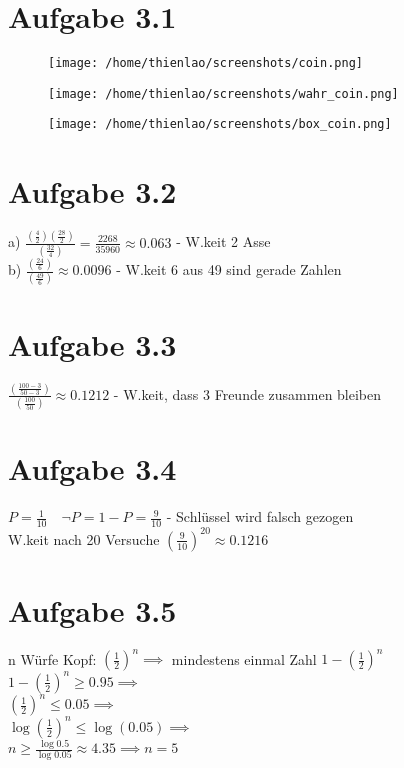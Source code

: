 \documentclass{article}
\begin{document}
		\section*{Aufgabe 3.1}
		\begin{figure} [h]
			\centering
			\texttt{[image: /home/thienlao/screenshots/coin.png]}
		\end{figure}
		\vspace{2cm}
		\begin{figure} [h]
			\centering
			\texttt{[image: /home/thienlao/screenshots/wahr\_coin.png]}
		\end{figure}
		\vspace{2cm}
		\begin{figure} [h]
			\centering
			\texttt{[image: /home/thienlao/screenshots/box\_coin.png]}
		\end{figure}
		
		\section*{Aufgabe 3.2}
		a) $\frac{(\frac{4}{2})(\frac{28}{2})}{(\frac{32}{4})} = \frac{2268}{35960} \approx 0.063$ - W.keit 2 Asse  \\
		\newline
		b) $\frac{(\frac{24}{6})}{(\frac{49}{6})} \approx 0.0096$ - W.keit 6 aus 49 sind gerade Zahlen
		
		\section*{Aufgabe 3.3}
		$\frac{(\frac{100 - 3}{50 - 3})}{(\frac{100}{50})} \approx 0.1212$ - W.keit, dass 3 Freunde zusammen bleiben
		
		\section*{Aufgabe 3.4}
		$P = \frac{1}{10} \quad \neg P = 1 - P = \frac{9}{10}$ - Schlüssel wird falsch gezogen \\
		\newline 
		W.keit nach 20 Versuche $(\frac{9}{10})^{20} \approx 0.1216$
		
		\section*{Aufgabe 3.5}
		n Würfe Kopf: $(\frac{1}{2})^n \implies$ mindestens einmal Zahl $1  - (\frac{1}{2})^n$ \\
		\newline
		$1 - (\frac{1}{2})^n \geq 0.95 \implies$ \\
		\newline
		$(\frac{1}{2})^n \leq 0.05 \implies$ \\
		\newline
		$\log(\frac{1}{2})^n \leq \log(0.05) \implies$ \\
		\newline
		$n \geq \frac{\log0.5}{\log0.05} \approx 4.35 \implies n=5$
		
\end{document}
